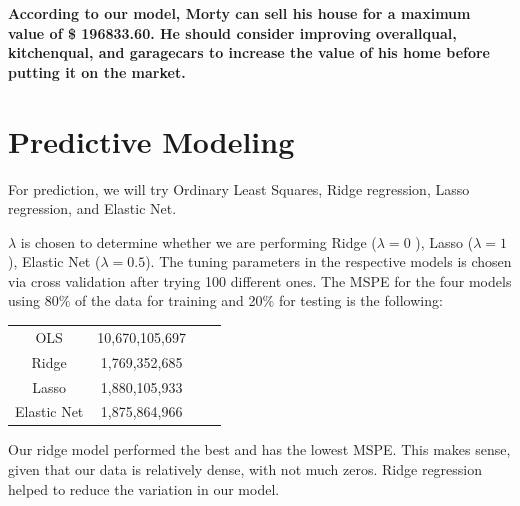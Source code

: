\documentclass[12pt]{article}
\begin{document}
\begin{flushleft}
\begin{flushleft}
\begin{flushleft}
\begin{flushleft}
\textbf{According to our model, Morty can sell his house for a maximum value of \$ 196833.60. He should consider improving overallqual, kitchenqual, and garagecars to increase the value of his home before putting it on the market.}

\end{flushleft}



\end{flushleft}

\section{Predictive Modeling}

\begin{flushleft}

For prediction, we will try Ordinary Least Squares, Ridge regression, Lasso regression, and Elastic Net. 

\begin{flushleft}

$\lambda$ is chosen to determine whether we are performing Ridge ($\lambda = 0$ ), Lasso ($\lambda = 1$), Elastic Net ($\lambda = 0.5$). The tuning parameters in the respective models is chosen via cross validation after trying 100 different ones. The MSPE for the four models using 80$\%$ of the data for training and 20$\%$ for testing is the following:
\end{flushleft}
\centering
\begin{tabular}{ |c|c|c|c|}
\hline
OLS & 10,670,105,697 \\
Ridge & 1,769,352,685 \\
Lasso & 1,880,105,933 \\
Elastic Net & 1,875,864,966 \\
\hline
\end{tabular}
\begin{flushleft}

Our ridge model performed the best and has the lowest MSPE. This makes sense, given that our data is relatively dense, with not much zeros. Ridge regression helped to reduce the variation in our model.


\end{flushleft}
\end{flushleft}
\end{flushleft}
\end{flushleft}
\end{document}

